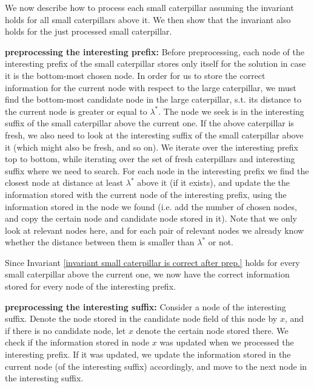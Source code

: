 \documentclass[11pt,a4paper]{article}
\newcounter{mycounter}
\newenvironment{noindlist}
 {\begin{list}{\arabic{mycounter}.~~}{\usecounter{mycounter} \labelsep=0em \labelwidth=0em \leftmargin=0em \itemindent=0em}}
 {\end{list}}
\theoremstyle{definition}
\theoremstyle{remark}
\begin{document}
We now describe how to process each small caterpillar assuming the invariant holds for all small caterpillars above it. We then show that the invariant also holds for the just processed small caterpillar. 

\begin{noindlist}
\item \textbf{preprocessing the interesting prefix:}
Before preprocessing, each node of the interesting prefix of the small caterpillar stores only itself for the solution in case it is the bottom-most chosen node. In order for us to store the correct information for the current node with respect to the large caterpillar, we must find the bottom-most candidate node in the large caterpillar, s.t. its distance to the current node is greater or equal to $\lambda^*$.
The node we seek is in the interesting suffix of the small caterpillar above the current one. If the above caterpillar is fresh, we also need to look at the interesting suffix of the small caterpillar above it (which might also be fresh, and so on). 
We iterate over the interesting prefix top to bottom, while iterating over the set of fresh caterpillars and interesting suffix where we need to search. For each node in the interesting prefix we find the closest node at distance at least $\lambda^*$ above it (if it exists), and update the the information stored with the current node of the interesting prefix, using the information stored in the node we found (i.e. add the number of chosen nodes, and copy the certain node and candidate node stored in it). Note that we only look at relevant nodes here, and for each pair of relevant nodes we already know whether the distance between them is smaller than $\lambda^*$ or not.

Since Invariant \ref{invariant small caterpillar is correct after prep.} holds for every small caterpillar above the current one, we now have the correct information stored for every node of the interesting prefix.



\item \textbf{preprocessing the interesting suffix:}
Consider a node of the interesting suffix. Denote the node stored in the candidate node field of this node by $x$, and if there is no candidate node, let $x$ denote the certain node stored there.
We check if the information stored in node $x$ was updated when we processed the interesting prefix. If it was updated, we update the information stored in the current node (of the interesting suffix) accordingly, and move to the next node in the interesting suffix. 


\end{noindlist}
\end{document}
